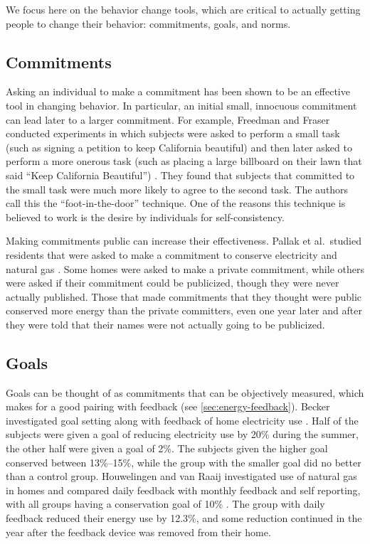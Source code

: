 We focus here on the behavior change tools, which are critical to actually getting people to change their behavior: commitments, goals, and norms.

\subsection{Commitments}

Asking an individual to make a commitment has been shown to be an effective tool in changing behavior. In particular, an initial small, innocuous commitment can lead later to a larger commitment. For example, Freedman and Fraser conducted experiments in which subjects were asked to perform a small task (such as signing a petition to keep California beautiful) and then later asked to perform a more onerous task (such as placing a large billboard on their lawn that said ``Keep California Beautiful'') \cite{Freedman66}. They found that subjects that committed to the small task were much more likely to agree to the second task. The authors call this the ``foot-in-the-door'' technique. One of the reasons this technique is believed to work is the desire by individuals for self-consistency.

Making commitments public can increase their effectiveness. Pallak et al.\ studied residents that were asked to make a commitment to conserve electricity and natural gas \cite{Pallak80}. Some homes were asked to make a private commitment, while others were asked if their commitment could be publicized, though they were never actually published. Those that made commitments that they thought were public conserved more energy than the private committers, even one year later and after they were told that their names were not actually going to be publicized.

\subsection{Goals}

Goals can be thought of as commitments that can be objectively measured, which makes for a good pairing with feedback (see \autoref{sec:energy-feedback}). Becker investigated goal setting along with feedback of home electricity use \cite{Becker78}. Half of the subjects were given a goal of reducing electricity use by 20\% during the summer, the other half were given a goal of 2\%. The subjects given the higher goal conserved between 13\%--15\%, while the group with the smaller goal did no better than a control group. Houwelingen and van Raaij investigated use of natural gas in homes and compared daily feedback with monthly feedback and self reporting, with all groups having a conservation goal of 10\% \cite{Houwelingen89}. The group with daily feedback reduced their energy use by 12.3\%, and some reduction continued in the year after the feedback device was removed from their home.

